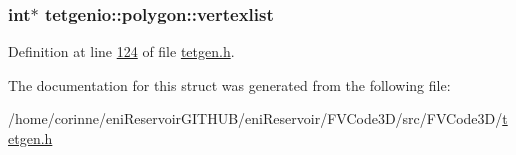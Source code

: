 \subsubsection[{\texorpdfstring{vertexlist}{vertexlist}}]{\setlength{\rightskip}{0pt plus 5cm}int$\ast$ tetgenio\+::polygon\+::vertexlist}\hypertarget{structtetgenio_1_1polygon_a3cc2d3756bc093db5c252dd8f42a5001}{}\label{structtetgenio_1_1polygon_a3cc2d3756bc093db5c252dd8f42a5001}


Definition at line \hyperlink{tetgen_8h_source_l00124}{124} of file \hyperlink{tetgen_8h_source}{tetgen.\+h}.



The documentation for this struct was generated from the following file\+:\begin{DoxyCompactItemize}
\item 
/home/corinne/eni\+Reservoir\+G\+I\+T\+H\+U\+B/eni\+Reservoir/\+F\+V\+Code3\+D/src/\+F\+V\+Code3\+D/\hyperlink{tetgen_8h}{tetgen.\+h}\end{DoxyCompactItemize}
